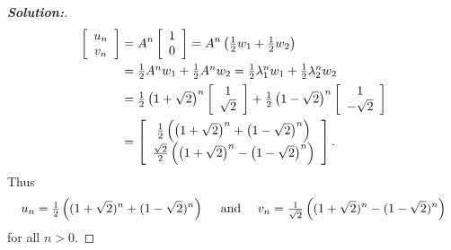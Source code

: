 \documentclass[a4paper]{amsart}
\theoremstyle{definition}
\newenvironment{solution}{\begin{proof}[\textbf{Solution:}] \vphantom{u}}{\end{proof}}
\begin{document}
\begin{solution}
\begin{align*}
 \left[ \begin{array}{c}u_{n}\\ v_{n} \end{array} \right] &=
   A^{n} \left[ \begin{array}{c}1\\ 0 \end{array} \right] =
   A^{n}\left({\textstyle \tfrac{1}{2} w_1 + \tfrac{1}{2} w_2}\right) \\
  & = {\textstyle \tfrac{1}{2} A^nw_1 + \tfrac{1}{2} A^nw_2 } =
      {\textstyle \tfrac{1}{2}\lambda_1^nw_1 + \tfrac{1}{2}\lambda_2^nw_2 }\\
  & = {\textstyle \tfrac{1}{2}}\left(\textstyle 1+\sqrt{2}\right)^{n}
       \left[ \begin{array}{c}1 \\ \sqrt{2} \end{array} \right] +
      {\textstyle \tfrac{1}{2}}\left(\textstyle 1-\sqrt{2}\right)^{n}
       \left[ \begin{array}{c}1 \\ -\sqrt{2} \end{array} \right]
  \\& =
       \left[ \begin{array}{c} {\textstyle \tfrac{1}{2}}\left(\left(\textstyle 1+\sqrt{2}\right)^{n} + \left(\textstyle 1-\sqrt{2}\right)^{n}\right)  \\
       {\textstyle \frac{\sqrt{2}}{2}}\left(\left(\textstyle 1+\sqrt{2}\right)^{n} - \left(\textstyle 1-\sqrt{2}\right)^{n}\right)  \\
       \end{array} \right].
 \end{align*}
 Thus
 $$ u_n={\textstyle \tfrac{1}{2}}\left( (1+\sqrt{2})^n + (1-\sqrt{2})^n\right)
    \quad \text{~and~} \quad
    v_n={\textstyle \frac{1}{\sqrt{2}}}\left((1+\sqrt{2})^n-(1-\sqrt{2})^n\right)
 $$
 for all $n > 0$.
\end{solution}
\end{document}

